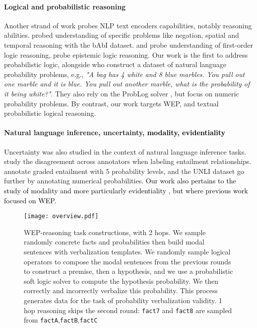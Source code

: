 \documentclass[11pt]{article}
\def \thecolor {black}
\newcommand{\blue}[1]{\textcolor{\thecolor}{#1}}
\begin{document}
\paragraph{Logical and probabilistic reasoning} Another strand of work probes NLP text encoders capabilities, notably reasoning abilities. \citet{weston2015towards} probed understanding of specific problems like negation, spatial and temporal reasoning with the bAbI dataset. \citet{richardson2020probing} and \citet{han2022folio} probe understanding of first-order logic reasoning, \citet{sileo2023mindgames} probe epistemic logic reasoning. Our work is the first to address probabilistic logic, alongside \citet{ijcai2017-0556,suster-etal-2021-mapping} who construct a dataset of natural language probability problems, e.g., \textit{"A bag has 4 white and 8 blue marbles. You pull out one marble and it is blue. You pull out another marble, what is the probability of it being white?"}. They also rely on the ProbLog solver \citep{de2007problog}, but focus on numeric probability problems. By contrast, our work targets WEP, and textual probabilistic logical reasoning.

\paragraph{Natural language inference, uncertainty, \blue{modality, evidentiality}}
Uncertainty was also studied in the context of natural language inference tasks. \citet{xzhou2022distnli} study the disagreement across annotators when labeling entailment relationships. \citet{ordinal-common-sense-inference} annotate graded entailment with 5 probability levels, and the UNLI dataset \citep{chen-etal-2020-uncertain} go further by annotating numerical probabilities.
\blue{
Our work also pertains to the study of modality \cite{modality, modalityannotation} and more particularly evidentiality \cite{su-etal-2010-evidentiality}, but where previous work focused on WEP.}



\begin{figure*}
 \centering
\texttt{[image: overview.pdf]}
  \caption{WEP-reasoning task constructions, with 2 hops.
  We sample randomly concrete facts  and probabilities   then build modal sentences with verbalization templates. We randomly sample logical operators to compose the modal sentences from the previous rounds to construct a premise, then a hypothesis, and we use a probabilistic soft logic solver to compute the hypothesis probability. We then correctly and incorrectly verbalize this probability. This process generates data for the task of probability verbalization validity.  1 hop reasoning skips the second round: \texttt{fact7} and \texttt{fact8} are sampled from \texttt{factA},\texttt{factB},\texttt{factC}}
  
\label{fig:overview} 
\end{figure*}
\end{document}

